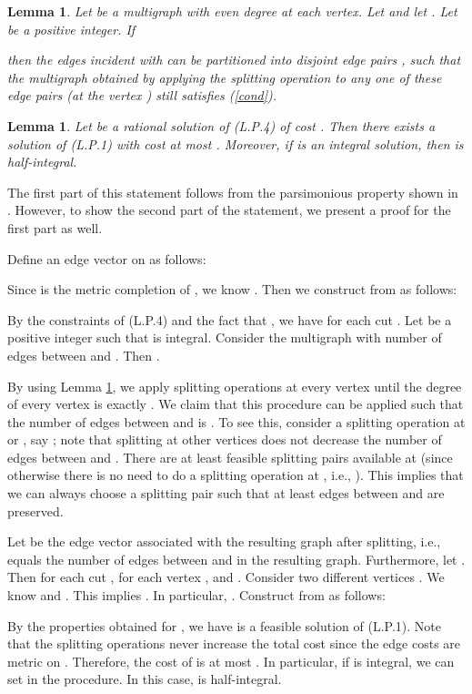 \documentclass[11pt]{article}
\newcommand{\qed}{\hspace*{\fill}}
\newtheorem{lemma}[theorem]{Lemma}
\newenvironment{proof}[1][Proof. ]{\noindent {\bf #1 }}{\qed}
\begin{document}
\begin{lemma}\cite{Lov74}\cite[Ex. 6.51]{Lov79}\label{lem:splitting}
Let  be a multigraph with even degree at each vertex.
Let  and let .
Let  be a positive integer. If


then the edges incident with  can be partitioned into
 disjoint edge pairs , 
such that the multigraph obtained by applying
the splitting operation to any one of these edge pairs (at the vertex )
still satisfies (\ref{cond}).
\end{lemma}

\begin{lemma}\label{lem:17trans}
Let  be a rational solution of (L.P.4) of cost .
Then there exists a solution  of (L.P.1) with cost at most .
Moreover, if  is an integral solution, then  is half-integral.
\end{lemma}
\begin{proof}
The first part of this statement follows from the parsimonious property shown in \cite{BT97}. However, to show the second part of the statement, we present a proof for the first part as well.

Define an edge vector  on  as follows:

Since  is the metric completion of , we know .
Then we construct  from  as follows:



By the constraints of (L.P.4) and
the fact that ,
we have  for each cut .
Let  be a positive integer such that  is integral.
Consider the multigraph  with 
number of edges between  and .
Then .

By using Lemma \ref{lem:splitting}, we apply splitting operations at every
vertex until the degree of every vertex is exactly . We claim
that this procedure can be applied such that the number of edges
between  and  is . To see this, consider a splitting
operation at  or , say ; note that splitting at other vertices
does not decrease the number of edges between  and . There are at
least  feasible splitting pairs available at  (since otherwise there is no
need to do a splitting operation at , i.e., ). This implies
that we can always choose a splitting pair such that at least 
edges between  and  are preserved.

Let  be the edge vector associated with the resulting graph after
splitting, i.e.,  equals the number of edges between
 and  in the resulting graph. Furthermore, let .
Then  for each cut ,  for
each vertex , and . Consider two different
vertices . We know  and
. This implies . In
particular, . Construct  from  as follows:



By the properties obtained for , we have  is a feasible
solution of (L.P.1). Note that the splitting operations never
increase the total cost since the edge costs are metric on .
Therefore, the cost of  is at most . In particular,
if  is integral, we can set  in the procedure.
In this case,  is half-integral.
\end{proof}
\end{document}
